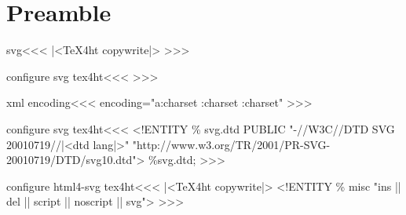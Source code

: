 %


\ifx \HTML\UnDef
   \def\HTML{svg,html4-svg}                   
   \def\CONFIG{\jobname}
   \def\MAKETITLE{\author{Eitan M. Gurari}}         
   \def\next{  \endinput}
   \expandafter\next
\fi




\chapter{Preamble}

\<svg\><<<
|<TeX4ht copywrite|>
>>>

\<configure svg tex4ht\><<<    
  {\IgnorePar{}}
>>>

\<xml encoding\><<<
 encoding="\expandafter\ifx \csname a:charset\endcsname\relax
         \expandafter{}\A:charset
   \else \expandafter{}\a:charset\fi"
>>>

\<configure svg tex4ht\><<<    
  {<!ENTITY \% svg.dtd PUBLIC "-//W3C//DTD SVG 20010719//|<dtd lang|>"\Hnewline
     "http://www.w3.org/TR/2001/PR-SVG-20010719/DTD/svg10.dtd">\Hnewline
   \%svg.dtd; \Hnewline}
>>>


\<configure html4-svg tex4ht\><<<    
|<TeX4ht copywrite|>
  {<!ENTITY \% misc "ins || del || script || noscript || svg">\Hnewline}
>>>


